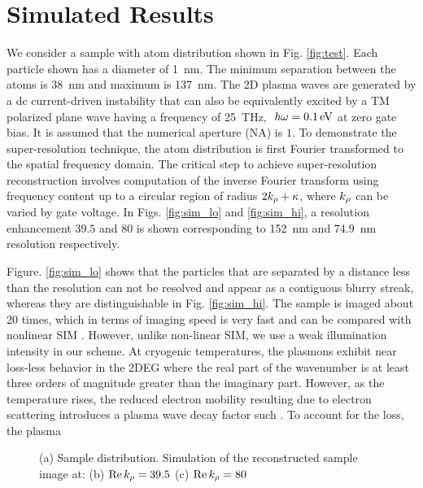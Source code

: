 \section{Simulated Results}
%
We consider a sample with atom distribution shown in Fig. \ref{fig:test}. Each particle shown has a diameter of \SI{1}{\nm}. The minimum separation between the atoms is \SI{38}{\nm} and maximum is \SI{137}{\nm}. The 2D plasma waves are generated by a dc current-driven instability that can also be equivalently  excited by a TM polarized plane wave having a frequency of \SI{25}{\THz}, $~h\omega = \SI{.1}{\electronvolt}$ at zero gate bias. It is assumed that the numerical aperture (NA) is $1$. To demonstrate the super-resolution technique, the atom distribution is first Fourier transformed to the spatial frequency domain. The critical step to achieve super-resolution reconstruction involves computation of the inverse Fourier transform using frequency content up to a circular region of radius $2k_{\rho} + \kappa$, where $k_{\rho}$ can be varied by gate voltage. In Figs. \ref{fig:sim_lo} and \ref{fig:sim_hi}, a resolution enhancement $39.5$ and $80$ is shown corresponding to \SI{152}{\nm} and \SI{74.9}{\nm} resolution respectively.

Figure. \ref{fig:sim_lo} shows that the particles that are separated by a distance less than the resolution can not be resolved and appear as a contiguous blurry streak, whereas they are distinguishable in Fig. \ref{fig:sim_hi}. The sample is imaged about 20 times, which in terms of imaging speed is very fast and can be compared with nonlinear SIM \cite{Gustafsson2005}. However, unlike non-linear SIM, we use a weak illumination intensity in our scheme.
%
At cryogenic temperatures, the plasmons exhibit near loss-less behavior in the 2DEG where the real part of the wavenumber is at least three orders of magnitude greater than the imaginary part. However, as the temperature rises, the reduced electron mobility resulting due to electron scattering introduces a plasma wave decay factor such . To account for the loss, the plasma

\begin{figure}[t!]
   \hfil
   \hfil
  \caption{(a) Sample distribution. Simulation of the reconstructed sample image at: (b) $\Re k_{\rho} = 39.5$ (c) $\Re k_{\rho} = 80$}
  \label{fig:simulation}
\end{figure}


